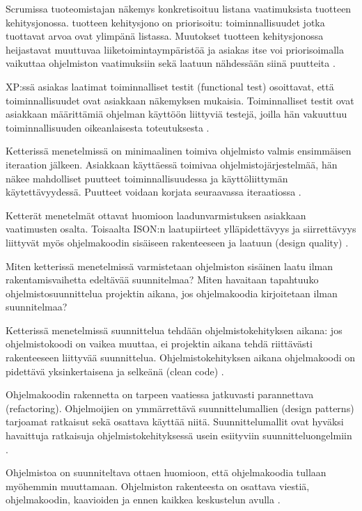 \documentclass[finnish]{tktltiki2}
\theoremstyle{definition}
\theoremstyle{remark}
\begin{document}
Scrumissa tuoteomistajan näkemys konkretisoituu listana vaatimuksista tuotteen kehitysjonossa. tuotteen kehitysjono on priorisoitu: toiminnallisuudet jotka tuottavat arvoa ovat ylimpänä listassa. Muutokset tuotteen kehitysjonossa heijastavat muuttuvaa liiketoimintaympäristöä ja asiakas itse voi priorisoimalla vaikuttaa ohjelmiston vaatimuksiin sekä laatuun nähdessään siinä puutteita \cite{SCH09}.

XP:ssä asiakas laatimat toiminnalliset testit (functional test) osoittavat, että toiminnallisuudet ovat asiakkaan näkemyksen mukaisia. Toiminnalliset testit ovat asiakkaan määrittämiä ohjelman käyttöön liittyviä testejä, joilla hän vakuuttuu toiminnallisuuden oikeanlaisesta toteutuksesta \cite{BEC99}. 

Ketterissä menetelmissä on minimaalinen toimiva ohjelmisto valmis ensimmäisen iteraation jälkeen. Asiakkaan käyttäessä toimivaa ohjelmisto\-järjestelmää, hän näkee mahdolliset puutteet toiminnallisuudessa ja käyttö\-liittymän käy\-tettävyydessä. Puutteet voidaan korjata seuraavassa iteraatiossa \cite{BEC99}.

Ketterät menetelmät ottavat huomioon laadunvarmistuksen asiakkaan vaatimusten osalta. Toisaalta ISON:n laatupiirteet ylläpidettävyys ja siirrettävyys liittyvät myös ohjelmakoodin sisäiseen rakenteeseen ja laatuun (design quality) \cite{KIP96}.

Miten ketterissä menetelmissä varmistetaan ohjelmiston sisäinen laatu ilman rakentamisvaihetta edeltävää suunnitelmaa? Miten havaitaan tapahtuuko ohjelmistosuunnittelua projektin aikana, jos ohjelmakoodia kirjoitetaan ilman suunnitelmaa?

Ketterissä menetelmissä suunnittelua tehdään ohjelmistokehityksen aikana: jos ohjelmistokoodi on vaikea muuttaa, ei projektin aikana tehdä riittävästi rakenteeseen liittyvää suunnittelua. Ohjelmistokehityksen aikana ohjelmakoodi on pidettävä yksinkertaisena ja selkeänä (clean code) \cite{FOW01b}.

Ohjelmakoodin rakennetta on tarpeen vaatiessa jatkuvasti parannettava (refactoring). Ohjelmoijien on ymmärrettävä suunnittelumallien (design patterns) tarjoamat ratkaisut sekä osattava käyttää niitä. Suunnittelumallit ovat hyväksi havaittuja ratkaisuja ohjelmistokehityksessä usein esiityviin suunnitteluongelmiin \cite{FOW01b}.

Ohjelmistoa on suunniteltava ottaen huomioon, että ohjelmakoodia tullaan myöhemmin muuttamaan. Ohjelmiston rakenteesta on osattava viestiä, ohjelmakoodin, kaavioiden ja ennen kaikkea keskustelun avulla \cite{FOW01b}. 
\end{document}
